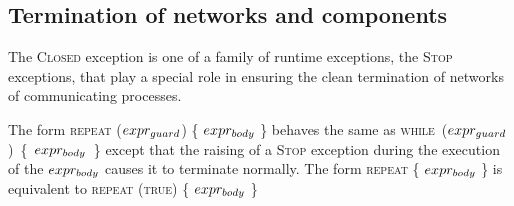 \documentclass[12pt]{IOS-Book-Article-CPA-2017}
\begin{document}
\subsection{Termination of networks and components}
The \textsc{Closed} exception is one of a family of runtime exceptions,
the \textsc{Stop} exceptions, that play a special role in ensuring 
the clean termination of networks of communicating processes.

The form
        \textsc{repeat} (\(expr\sb{guard}\)) \{ \(expr\sb{body}\) \}
behaves the same as
        \mbox{\textsc{while} (\(expr\sb{guard}\)) \{ \(expr\sb{body}\) \}}
except that the raising of a \textsc{Stop} exception during the
execution of the \(expr\sb{body}\) causes it 
to terminate normally.
%
The  form
        \textsc{repeat} \{ \(expr\sb{body}\) \}
is equivalent to 
        \textsc{repeat} (\textsc{true}) \{ \(expr\sb{body}\) \}
\end{document}
